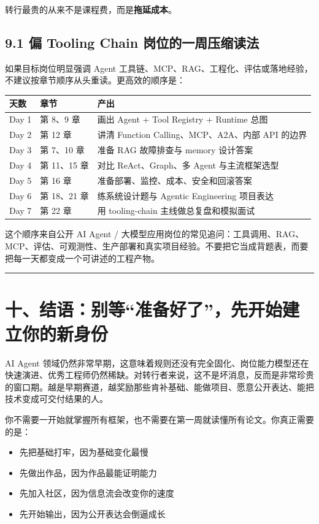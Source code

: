 转行最贵的从来不是课程费，而是\textbf{拖延成本}。


\subsection{9.1 偏 Tooling Chain 岗位的一周压缩读法}

如果目标岗位明显强调 Agent 工具链、MCP、RAG、工程化、评估或落地经验，不建议按章节顺序从头重读。更高效的顺序是：


\begingroup
\scriptsize
\setlength{\tabcolsep}{3pt}
\begin{longtable}{|p{}|p{}|p{}|}
\hline
天数 & 章节 & 产出 \\ \hline
Day 1 & 第 8、9 章 & 画出 Agent + Tool Registry + Runtime 总图 \\ \hline
Day 2 & 第 12 章 & 讲清 Function Calling、MCP、A2A、内部 API 的边界 \\ \hline
Day 3 & 第 7、10 章 & 准备 RAG 故障排查与 memory 设计答案 \\ \hline
Day 4 & 第 11、15 章 & 对比 ReAct、Graph、多 Agent 与主流框架选型 \\ \hline
Day 5 & 第 16 章 & 准备部署、监控、成本、安全和回滚答案 \\ \hline
Day 6 & 第 18、21 章 & 练系统设计题与 Agentic Engineering 项目表达 \\ \hline
Day 7 & 第 22 章 & 用 tooling-chain 主线做总复盘和模拟面试 \\ \hline
\end{longtable}
\endgroup

这个顺序来自公开 AI Agent / 大模型应用岗位的常见追问：工具调用、RAG、MCP、评估、可观测性、生产部署和真实项目经验。不要把它当成背题表，而要把每一天都变成一个可讲述的工程产物。


\bigskip\hrule\bigskip

\section{十、结语：别等``准备好了''，先开始建立你的新身份}

AI Agent 领域仍然非常早期，这意味着规则还没有完全固化、岗位能力模型还在快速演进、优秀工程师仍然稀缺。对转行者来说，这不是坏消息，反而是非常珍贵的窗口期。越是早期赛道，越奖励那些肯补基础、能做项目、愿意公开表达、能把技术变成可交付结果的人。


你不需要一开始就掌握所有框架，也不需要在第一周就读懂所有论文。你真正需要的是：


\begin{itemize}[leftmargin=2em]
\item 先把基础打牢，因为基础变化最慢
\item 先做出作品，因为作品最能证明能力
\item 先加入社区，因为信息流会改变你的速度
\item 先开始输出，因为公开表达会倒逼成长
\end{itemize}

